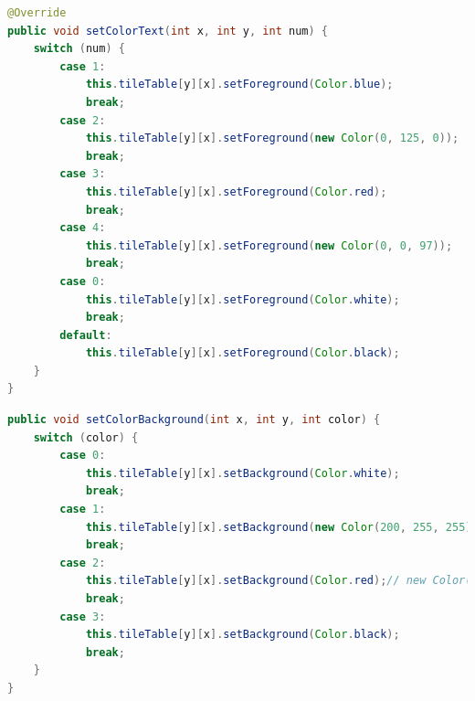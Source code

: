 \documentclass[a4j,11pt]{jsarticle}
\begin{document}
\newpage
{}
\begin{lstlisting}[caption=\ttfamily setColorText, label=src:setColorText,language=Java]
@Override
public void setColorText(int x, int y, int num) {
    switch (num) {
        case 1:
            this.tileTable[y][x].setForeground(Color.blue);
            break;
        case 2:
            this.tileTable[y][x].setForeground(new Color(0, 125, 0));
            break;
        case 3:
            this.tileTable[y][x].setForeground(Color.red);
            break;
        case 4:
            this.tileTable[y][x].setForeground(new Color(0, 0, 97));
            break;
        case 0:
            this.tileTable[y][x].setForeground(Color.white);
            break;
        default:
            this.tileTable[y][x].setForeground(Color.black);
    }
}
\end{lstlisting}
\begin{lstlisting}[caption=\ttfamily setColorBackground, label=src:setColorBackground,language=Java]
public void setColorBackground(int x, int y, int color) {
    switch (color) {
        case 0:
            this.tileTable[y][x].setBackground(Color.white);
            break;
        case 1:
            this.tileTable[y][x].setBackground(new Color(200, 255, 255));// new Color(RGB)
            break;
        case 2:
            this.tileTable[y][x].setBackground(Color.red);// new Color(RGB)
            break;
        case 3:
            this.tileTable[y][x].setBackground(Color.black);
            break;
    }
}
\end{lstlisting}
\end{document}
